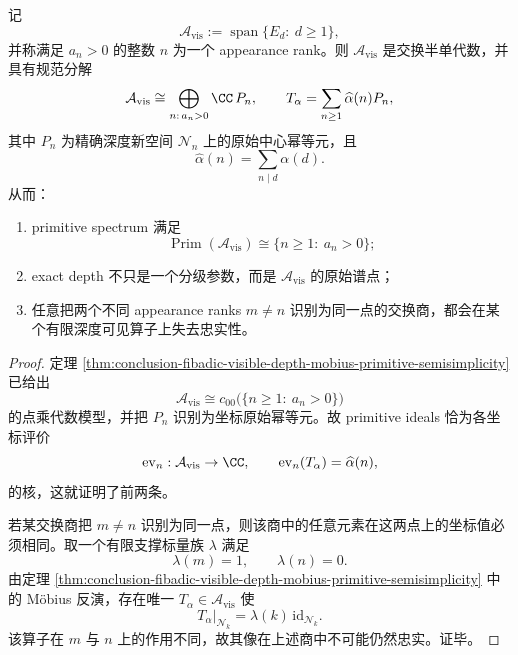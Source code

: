 \begin{theorem}\label{thm:conclusion-fibadic-visible-algebra-primitive-spectrum}
记
\[
\mathcal A_{\mathrm{vis}}
:=
\operatorname{span}\{E_d:\ d\ge 1\},
\]
并称满足 \(a_n>0\) 的整数 \(n\) 为一个 appearance rank。则 \(\mathcal A_{\mathrm{vis}}\) 是交换半单代数，并具有规范分解
\[
\mathcal A_{\mathrm{vis}}
\cong
\bigoplus_{n:\,a_n>0}\CC\,P_n,
\qquad
T_\alpha=\sum_{n\ge 1}\widehat\alpha(n)P_n,
\]
其中 \(P_n\) 为精确深度新空间 \(\mathcal N_n\) 上的原始中心幂等元，且
\[
\widehat\alpha(n)=\sum_{n\mid d}\alpha(d).
\]
从而：
\begin{enumerate}
  \item primitive spectrum 满足
  \[
  \operatorname{Prim}(\mathcal A_{\mathrm{vis}})
  \cong
  \{n\ge 1:\ a_n>0\};
  \]
  \item exact depth 不只是一个分级参数，而是 \(\mathcal A_{\mathrm{vis}}\) 的原始谱点；
  \item 任意把两个不同 appearance ranks \(m\neq n\) 识别为同一点的交换商，都会在某个有限深度可见算子上失去忠实性。
\end{enumerate}
\end{theorem}
\begin{proof}
定理
\ref{thm:conclusion-fibadic-visible-depth-mobius-primitive-semisimplicity}
已给出
\[
\mathcal A_{\mathrm{vis}}
\cong
c_{00}\bigl(\{n\ge 1:\ a_n>0\}\bigr)
\]
的点乘代数模型，并把 \(P_n\) 识别为坐标原始幂等元。故 primitive ideals 恰为各坐标评价
\[
\operatorname{ev}_n:\mathcal A_{\mathrm{vis}}\to \CC,
\qquad
\operatorname{ev}_n(T_\alpha)=\widehat\alpha(n),
\]
的核，这就证明了前两条。

若某交换商把 \(m\neq n\) 识别为同一点，则该商中的任意元素在这两点上的坐标值必须相同。取一个有限支撑标量族 \(\lambda\) 满足
\[
\lambda(m)=1,
\qquad
\lambda(n)=0.
\]
由定理
\ref{thm:conclusion-fibadic-visible-depth-mobius-primitive-semisimplicity}
中的 Möbius 反演，存在唯一 \(T_\alpha\in \mathcal A_{\mathrm{vis}}\) 使
\[
T_\alpha|_{\mathcal N_k}=\lambda(k)\,\mathrm{id}_{\mathcal N_k}.
\]
该算子在 \(m\) 与 \(n\) 上的作用不同，故其像在上述商中不可能仍然忠实。证毕。
\end{proof}

